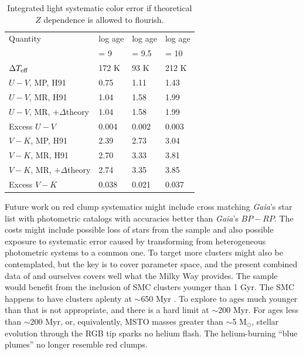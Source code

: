 \documentclass[twocolumn,times]{aastex631}
\begin{document}
\begin{table}
	\centering
	\caption{Integrated light systematic color error if theoretical $Z$ dependence is allowed to flourish.}
	\label{tab:integratedlight}
 \begin{tabular}{llll}
		\hline
  Quantity & log age   & log age  & log age  \\
           &  = 9  &  = 9.5 &  = 10 \\
		\hline
  $\Delta T_{\rm eff}$ & 172 K & 93 K & 212 K \\
  \hline
$U-V$, MP, H91 &  0.75 & 1.11 & 1.43 \\
$U-V$, MR, H91 &  1.04 & 1.58 & 1.99 \\
$U-V$, MR, $+\Delta$theory & 1.04 & 1.58 & 1.99 \\
Excess $U-V$ & 0.004 & 0.002 & 0.003 \\
	\hline
$V-K$, MP, H91 & 2.39 & 2.73 & 3.04 \\
$V-K$, MR, H91 & 2.70 & 3.33 & 3.81 \\
$V-K$, MR, $+\Delta$theory & 2.74 & 3.35 & 3.85 \\
Excess $V-K$ & 0.038 & 0.021 & 0.037 \\
  		\hline
	\end{tabular}
\end{table}

Future work on red clump systematics might include cross matching \textit{Gaia}'s star list with photometric catalogs with accuracies better than \textit{Gaia}'s $BP-RP$. The costs might include possible loss of stars from the sample and also possible exposure to systematic error caused by transforming from heterogeneous photometric systems to a common one. To target more clusters might also be contemplated, but the key is to cover parameter space, and the present combined data of  and ourselves covers well what the Milky Way provides. The sample would benefit from the inclusion of SMC clusters younger than 1 Gyr. The SMC happens to have clusters aplenty at $\sim$650 Myr \citep{2010A&A...517A..50G}. To explore to ages much younger than that is not appropriate, and there is a hard limit at $\sim$200 Myr. For ages less than $\sim$200 Myr, or, equivalently, MSTO masses greater than $\sim$5 M$_\odot$, stellar evolution through the RGB tip sparks no helium flash. The helium-burning ``blue plumes'' no longer resemble red clumps. 
\end{document}
